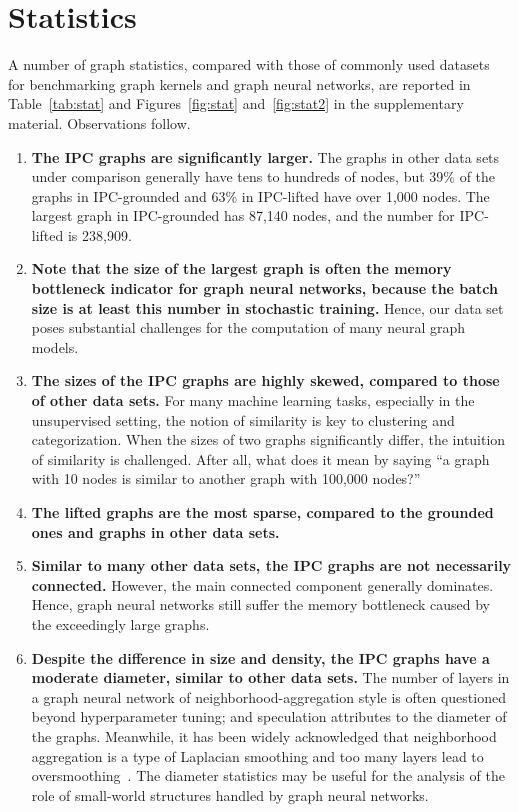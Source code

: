 \documentclass{article}
\begin{document}
\section{Statistics}\label{sec:stat}
A number of graph statistics, compared with those of commonly used datasets~\cite{Kersting2016} for benchmarking graph kernels and graph neural networks, are reported in Table~\ref{tab:stat} and Figures~\ref{fig:stat} and~\ref{fig:stat2} in the supplementary material. Observations follow.

\begin{enumerate}[leftmargin=*]
\item \textbf{The IPC graphs are significantly larger.} The graphs in other data sets under comparison generally have tens to hundreds of nodes, but 39\% of the graphs in IPC-grounded and 63\% in IPC-lifted have over 1,000 nodes. The largest graph in IPC-grounded has 87,140 nodes, and the number for IPC-lifted is 238,909.

\item \textbf{Note that the size of the largest graph is often the memory bottleneck indicator for graph neural networks, because the batch size is at least this number in stochastic training.} Hence, our data set poses substantial challenges for the computation of many neural graph models.

\item \textbf{The sizes of the IPC graphs are highly skewed, compared to those of other data sets.} For many machine learning tasks, especially in the unsupervised setting, the notion of similarity is key to clustering and categorization. When the sizes of two graphs significantly differ, the intuition of similarity is challenged. After all, what does it mean by saying ``a graph with 10 nodes is similar to another graph with 100,000 nodes?''

\item \textbf{The lifted graphs are the most sparse, compared to the grounded ones and graphs in other data sets.}

\item \textbf{Similar to many other data sets, the IPC graphs are not necessarily connected.} However, the main connected component generally dominates. Hence, graph neural networks still suffer the memory bottleneck caused by the exceedingly large graphs.

\item \textbf{Despite the difference in size and density, the IPC graphs have a moderate diameter, similar to other data sets.} The number of layers in a graph neural network of neighborhood-aggregation style is often questioned beyond hyperparameter tuning; and speculation attributes to the diameter of the graphs. Meanwhile, it has been widely acknowledged that neighborhood aggregation is a type of Laplacian smoothing and too many layers lead to oversmoothing~\citep{Li2018,Xu2018,Klicpera2019}. The diameter statistics may be useful for the analysis of the role of small-world structures handled by graph neural networks.
\end{enumerate}
\end{document}
